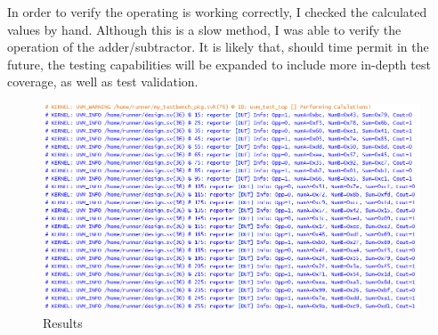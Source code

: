 \documentclass{article}
\begin{document}
In order to verify the operating is working correctly, I checked the calculated values by hand. Although this is a slow method, I was able to verify the operation of the adder/subtractor. It is likely that, should time permit in the future, the testing capabilities will be expanded to include more in-depth test coverage, as well as test validation.

\begin{center}
	\begin{figure}[h!]
		\includegraphics[width=.9\textwidth]{results.png}
		\caption{Results}
		\label{fig:results}
	\end{figure}
\end{center}
\end{document}
